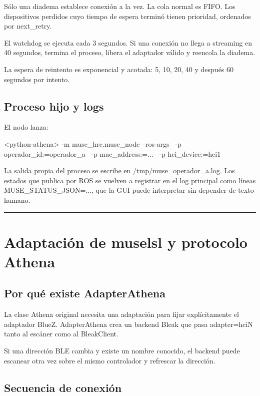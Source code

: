 \documentclass[11pt,a4paper]{article}
\begin{document}
Sólo una diadema establece conexión a la vez. La cola normal es FIFO. Los dispositivos perdidos cuyo tiempo de espera terminó tienen prioridad, ordenados por {\ttfamily\small next\_retry}.

El watchdog se ejecuta cada 3 segundos. Si una conexión no llega a streaming en 40
segundos, termina el proceso, libera el adaptador válido y reencola la diadema.

La espera de reintento es exponencial y acotada: 5, 10, 20, 40 y después 60 segundos por
intento.

\subsection{Proceso hijo y logs}

El nodo lanza:

\begin{MuseCode}
<python-athena> -m muse_hrc.muse_node --ros-args \
  -p operador_id:=operador_a \
  -p mac_address:=... \
  -p hci_device:=hci1
\end{MuseCode}

La salida propia del proceso se escribe en {\ttfamily\small /tmp/muse\_operador\_a.log}. Los estados que publica por ROS se vuelven a registrar en el log principal como líneas {\ttfamily\small MUSE\_STATUS\_JSON=...}, que la GUI puede interpretar sin depender de texto humano.

\medskip\hrule\medskip

\section{Adaptación de {\ttfamily\small muselsl} y protocolo Athena}

\subsection{Por qué existe {\ttfamily\small AdapterAthena}}

La clase Athena original necesita una adaptación para fijar explícitamente el adaptador BlueZ. {\ttfamily\small AdapterAthena} crea un backend Bleak que pasa {\ttfamily\small adapter=hciN} tanto al escáner como al {\ttfamily\small BleakClient}.

Si una dirección BLE cambia y existe un nombre conocido, el backend puede escanear otra vez sobre el mismo controlador y refrescar la dirección.

\subsection{Secuencia de conexión}
\end{document}
